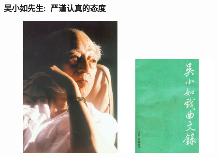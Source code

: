 \documentclass[cjk,slidestop,compress,mathserif,blue]{beamer}
\begin{document}
\frame
{
	\frametitle{吴小如先生:~严谨认真的态度}
\begin{figure}[h!]
\centering
\vspace{-0.2in}
\includegraphics[height=0.64\textwidth,width=0.46\textwidth,viewport=0 0 360 520,clip]{Figures/Wu_Xiaoru.jpg}
\hskip 5pt
\includegraphics[height=0.64\textwidth,width=0.46\textwidth,viewport=39 5 200 235,clip]{Figures/Wu_Wenlu.jpg}
\label{Wu_Xiaoru}
\end{figure}
}
\end{document}
